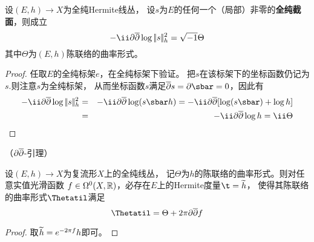 
\begin{prop}
\label{用全纯截面计算Hermite线丛的陈曲率-prop}
设$(E,h)\to X$为全纯Hermite线丛，
设$s$为$E$的任何一个（局部）非零的\textbf{全纯截面}，则成立
$$-\ii\p\pbar\log\norm{s}^2_h=\sqrt{-1}\Theta$$
其中$\Theta$为$(E,h)$陈联络的曲率形式。
\end{prop}

\begin{proof}任取$E$的全纯标架$e$，在全纯标架下验证。
把$s$在该标架下的坐标函数仍记为$s$.则注意$s$为全纯标架，
从而坐标函数$s$满足$\pbar s=\p\sbar=0$，因此有
\begin{eqnarray*}
  -\ii\p\pbar\log\norm{s}^2_h
&=&
  -\ii\p\pbar\log(s\sbar h)
=
  -\ii\p\pbar[\log(s\sbar)+\log h]\\
&=&
  -\ii\p\pbar\log h
=
  \ii\Theta
\end{eqnarray*}
\end{proof}

\begin{cor}（$\partial\overline{\partial}$-引理）

设$(E,h)\to X$为复流形$X$上的全纯线丛，
记$\Theta$为$h$的陈联络的曲率形式。则对任意实值光滑函数
$f\in\Omega^0(X,\mathbb{R})$，必存在$E$上的Hermite度量$\t=\htil$，
使得其陈联络的曲率形式$\Thetatil$满足
$$\Thetatil=\Theta+2\pi\p\pbar f$$
\end{cor}
\begin{proof}
取$\widetilde{h}=e^{-2\pi f}h$即可。
\end{proof}


